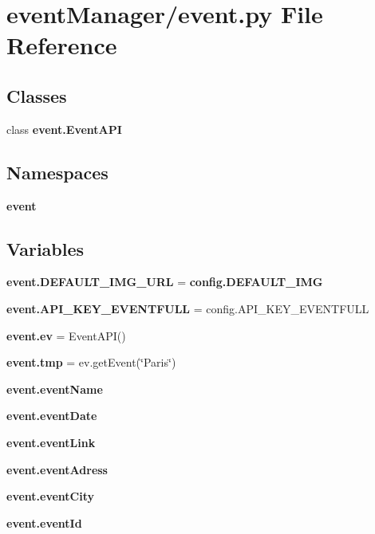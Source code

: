 \section{event\+Manager/event.py File Reference}
\label{event_8py}
\subsection*{Classes}
\begin{DoxyCompactItemize}
\item 
class {\bf event.\+Event\+A\+PI}
\end{DoxyCompactItemize}
\subsection*{Namespaces}
\begin{DoxyCompactItemize}
\item 
 {\bf event}
\end{DoxyCompactItemize}
\subsection*{Variables}
\begin{DoxyCompactItemize}
\item 
{\bf event.\+D\+E\+F\+A\+U\+L\+T\+\_\+\+I\+M\+G\+\_\+\+U\+RL} = {\bf config.\+D\+E\+F\+A\+U\+L\+T\+\_\+\+I\+MG}
\item 
{\bf event.\+A\+P\+I\+\_\+\+K\+E\+Y\+\_\+\+E\+V\+E\+N\+T\+F\+U\+LL} = config.\+A\+P\+I\+\_\+\+K\+E\+Y\+\_\+\+E\+V\+E\+N\+T\+F\+U\+LL
\item 
{\bf event.\+ev} = Event\+A\+PI()
\item 
{\bf event.\+tmp} = ev.\+get\+Event(\char`\"{}Paris\char`\"{})
\item 
{\bf event.\+event\+Name}
\item 
{\bf event.\+event\+Date}
\item 
{\bf event.\+event\+Link}
\item 
{\bf event.\+event\+Adress}
\item 
{\bf event.\+event\+City}
\item 
{\bf event.\+event\+Id}
\end{DoxyCompactItemize}
